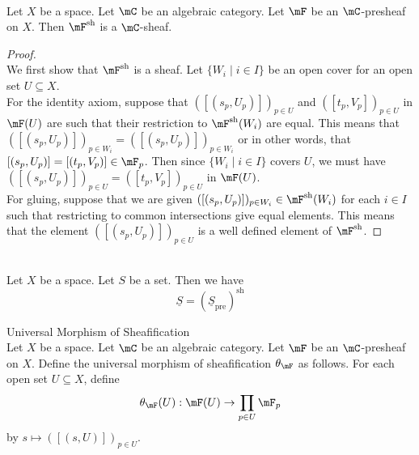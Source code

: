 \documentclass[a4paper]{article}
\begin{document}
\begin{lmm}{}{}\\
Let $X$ be a space. Let $\mC$ be an algebraic category. Let $\mF$ be an $\mC$-presheaf on $X$. Then $\mF^\text{sh}$ is a $\mC$-sheaf. 
\begin{proof}\\
We first show that $\mF^\text{sh}$ is a sheaf. Let $\{W_i\;|\;i\in I\}$ be an open cover for an open set $U\subseteq X$. \\

For the identity axiom, suppose that $([(s_p,U_p)])_{p\in U}$ and $([t_p,V_p])_{p\in U}$ in $\mF(U)$ are such that their restriction to $\mF^\text{sh}(W_i)$ are equal. This means that $([(s_p,U_p)])_{p\in W_i}=([(s_p,U_p)])_{p\in W_i}$ or in other words, that $[(s_p,U_p)]=[(t_p,V_p)]\in\mF_p$. Then since $\{W_i\;|\;i\in I\}$ covers $U$, we must have $([(s_p,U_p)])_{p\in U}=([t_p,V_p])_{p\in U}$ in $\mF(U)$. \\

For gluing, suppose that we are given $([(s_p,U_p)])_{p\in W_i}\in\mF^\text{sh}(W_i)$ for each $i\in I$ such that restricting to common intersections give equal elements. This means that the element $([(s_p,U_p)])_{p\in U}$ is a well defined element of $\mF^\text{sh}$. 
\end{proof}
\end{lmm}

\begin{eg}{}{}\\
Let $X$ be a space. Let $S$ be a set. Then we have $$\underline{S}=\left(\underline{S}_\text{pre}\right)^\text{sh}$$
\end{eg}

\begin{defn}{Universal Morphism of Sheafification}{}\\
Let $X$ be a space. Let $\mC$ be an algebraic category. Let $\mF$ be an $\mC$-presheaf on $X$. Define the universal morphism of sheafification $\theta_\mF$ as follows. For each open set $U\subseteq X$, define $$\theta_\mF(U):\mF(U)\to\prod_{p\in U}\mF_p$$ by $s\mapsto([(s,U)])_{p\in U}$. 
\end{defn}
\end{document}
